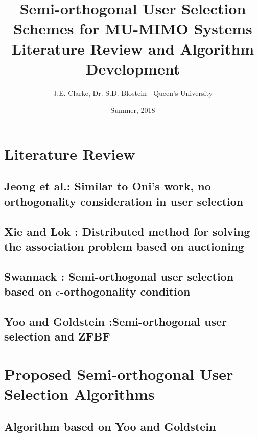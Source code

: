 \documentclass[11pt]{report}
\title{Semi-orthogonal User Selection Schemes for MU-MIMO Systems\\ Literature Review and Algorithm Development}
\author{J.E. Clarke, Dr. S.D. Blostein | Queen's University}
\date{Summer, 2018}
\begin{document}
	\maketitle
	\newpage
    \section{Literature Review}
    	\subsection{Jeong et al.\cite{7354607}: Similar to Oni's work, no orthogonality consideration in user selection}
            	
        \subsection{Xie and Lok \cite{7510766}: Distributed method for solving the association problem based on auctioning}
            
    
        \subsection{Swannack \cite{1549555}: Semi-orthogonal user selection based on $\epsilon$-orthogonality condition}
            
            
        \subsection{Yoo and Goldstein \cite{1603708}:Semi-orthogonal user selection and ZFBF }
            
    
    \section{Proposed Semi-orthogonal User Selection Algorithms}
        \subsection{Algorithm based on Yoo and Goldstein \cite{1603708}}
            
	
    
    \newpage	
 	\begingroup
 		\renewcommand{\section}[2]{}%
 		
 		
 	\endgroup
\end{document}
